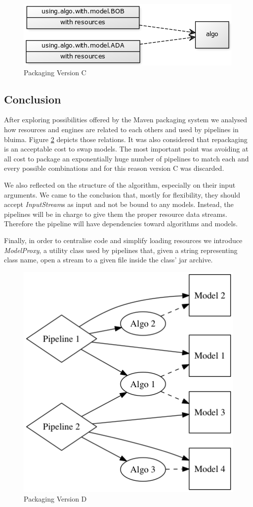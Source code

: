 \documentclass{article}
\newcommand{\id}[1]{\mbox{\textit{#1}}}
\begin{document}
\begin{figure}
\centering
\includegraphics{res/packaging_version_C.png}
\caption{Packaging Version C}
\label{fig:pkgsysC}
\end{figure}


\subsection{Conclusion}

After exploring possibilities offered by the Maven packaging system we analysed how resources and engines are related to each others and used by pipelines in bluima. Figure \ref{fig:pkgsysD} depicts those relations. It was also considered that repackaging is an acceptable cost to swap models. The most important point was avoiding at all cost to package an exponentially huge number of pipelines to match each and every possible combinations and for this reason version C was discarded.

We also reflected on the structure of the algorithm, especially on their input arguments. We came to the conclusion that, mostly for flexibility, they should accept \id{InputStream}s as input and not be bound to any models. Instead, the pipelines will be in charge to give them the proper resource data streams. Therefore the pipeline will have dependencies toward algorithms and models.

Finally, in order to centralise code and simplify loading resources we introduce \id{ModelProxy}, a utility class used by pipelines that, given a string representing class name, open a stream to a given file inside the class' jar archive.

\begin{figure}
\centering
\includegraphics{res/packaging_version_D.png}
\caption{Packaging Version D}
\label{fig:pkgsysD}
\end{figure}

\end{document}
